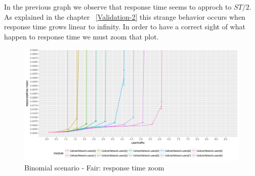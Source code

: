 In the previous graph we observe that response time seems to approch to \(ST/2\). As explained in the chapter ~\ref{Validation-2} this strange behavior occurs when response time grows linear to infinity. In order to have a correct sight of what happen to response time we must zoom that plot.
\begin{figure}[H]
  \includegraphics[width=1\textwidth]{images/allrt-binom}
  \caption{Binomial scenario - Fair: response time zoom}
  \label{fig:Binomial scenario - Fair: response time zoom}
\end{figure}

